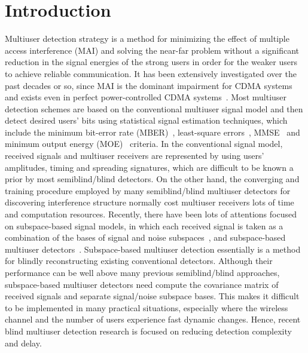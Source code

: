 \documentclass[a4paper,10pt,fleqn, twocolumn]{IEEETran}
\begin{document}
\section{Introduction}
Multiuser detection strategy is a method for minimizing the effect
of multiple access interference (MAI) and solving the near-far
problem without a significant reduction in the signal energies of
the strong users in order for the weaker users to achieve reliable
communication. It has been extensively investigated over the past
decades or so, since MAI is the dominant impairment for CDMA
systems and exists even in perfect power-controlled CDMA
systems~\cite{Verd86,Verd89,Lupa89,Madh94,Honi95,Wang98,Verd98,Wang99}.
Most multiuser detection schemes are based on the conventional
multiuser signal model and then detect desired users' bits using
statistical signal estimation techniques, which include the
minimum bit-error rate (MBER)~\cite{Verd86,Verd89}, least-square
errors~\cite{Lupa89}, MMSE~\cite{Lupa89,Madh94,Honi95} and minimum
output energy (MOE)~\cite{Honi95} criteria. In the conventional
signal model, received signals and multiuser receivers are
represented by using users' amplitudes, timing and spreading
signatures, which are difficult to be known a prior by most
semiblind/blind detectors. On the other hand, the converging and
training procedure employed by many semiblind/blind multiuser
detectors for discovering interference structure normally cost
multiuser receivers lots of time and computation resources.
Recently, there have been lots of attentions focused on
subspace-based signal models, in which each received signal is
taken as a combination of the bases of signal and noise
subspaces~\cite{Yang95,Liu96,Torl97}, and subspace-based multiuser
detectors~\cite{Wang98,Wang99}. Subspace-based multiuser detection
essentially is a method for blindly reconstructing existing
conventional detectors. Although their performance can be well
above many previous semiblind/blind approaches, subspace-based
multiuser detectors need compute the covariance matrix of received
signals and separate signal/noise subspace bases. This makes it
difficult to be implemented in many practical situations,
especially where the wireless channel and the number of users
experience fast dynamic changes. Hence, recent blind multiuser
detection research is focused on reducing detection complexity and
delay.
\end{document}
